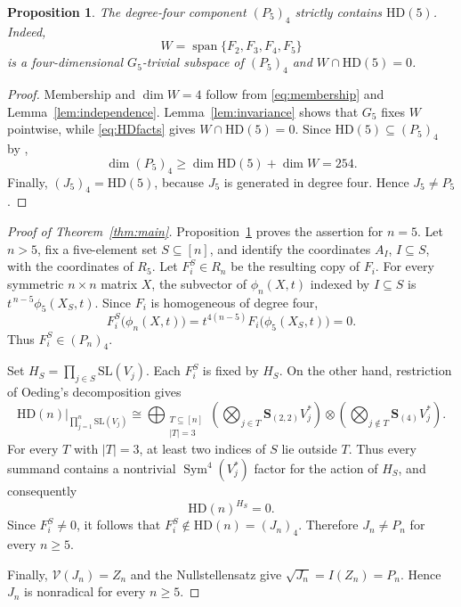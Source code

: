 \documentclass[11pt]{amsart}
\newtheorem{proposition}[theorem]{Proposition}
\theoremstyle{remark}
\newcommand{\HD}{\mathrm{HD}}
\newcommand{\Sym}{\operatorname{Sym}}
\newcommand{\bS}{\mathbf S}
\newcommand{\Span}{\operatorname{span}}
\begin{document}
\begin{proposition}\label{prop:n5}
The degree-four component \((P_5)_4\) strictly contains \(\HD(5)\).
Indeed,
\[
  W=\Span\{F_2,F_3,F_4,F_5\}
\]
is a four-dimensional \(G_5\)-trivial subspace of \((P_5)_4\) and
\(W\cap\HD(5)=0\).
\end{proposition}

\begin{proof}
Membership and \(\dim W=4\) follow from
\eqref{eq:membership} and Lemma~\ref{lem:independence}.
Lemma~\ref{lem:invariance} shows that \(G_5\) fixes \(W\) pointwise,
while \eqref{eq:HDfacts} gives \(W\cap\HD(5)=0\). Since
\(\HD(5)\subseteq(P_5)_4\) by \cite[Proposition~5.5]{Oeding},
\[
  \dim(P_5)_4\geq\dim\HD(5)+\dim W=254.
\]
Finally, \((J_5)_4=\HD(5)\), because \(J_5\) is generated in degree
four. Hence \(J_5\neq P_5\).
\end{proof}

\begin{proof}[Proof of Theorem~\ref{thm:main}]
Proposition~\ref{prop:n5} proves the assertion for \(n=5\).
Let \(n>5\), fix a five-element set \(S\subseteq[n]\), and identify the
coordinates \(A_I\), \(I\subseteq S\), with the coordinates of
\(R_5\). Let \(F_i^S\in R_n\) be the resulting copy of \(F_i\).
For every symmetric \(n\times n\) matrix \(X\), the subvector of
\(\phi_n(X,t)\) indexed by \(I\subseteq S\) is
\(t^{\,n-5}\phi_5(X_S,t)\). Since \(F_i\) is homogeneous of degree four,
\[
  F_i^S\bigl(\phi_n(X,t)\bigr)
  =t^{4(n-5)}F_i\bigl(\phi_5(X_S,t)\bigr)=0.
\]
Thus \(F_i^S\in(P_n)_4\).

Set \(H_S=\prod_{j\in S}\mathrm{SL}(V_j)\). Each \(F_i^S\) is fixed by
\(H_S\). On the other hand, restriction of Oeding's decomposition gives
\[
 \HD(n)\big|_{\prod_{j=1}^n\mathrm{SL}(V_j)}
 \cong
 \bigoplus_{\substack{T\subseteq[n]\\ |T|=3}}
 \left(
   \bigotimes_{j\in T}\bS_{(2,2)}V_j^*
 \right)
 \otimes
 \left(
   \bigotimes_{j\notin T}\bS_{(4)}V_j^*
 \right).
\]
For every \(T\) with \(|T|=3\), at least two indices of \(S\) lie
outside \(T\). Thus every summand contains a nontrivial
\(\Sym^4(V_j^*)\) factor for the action of \(H_S\), and consequently
\[
  \HD(n)^{H_S}=0.
\]
Since \(F_i^S\neq0\), it follows that \(F_i^S\notin\HD(n)=(J_n)_4\).
Therefore \(J_n\neq P_n\) for every \(n\geq5\).

Finally, \(\mathcal V(J_n)=Z_n\) \cite[Theorem~1.3]{Oeding} and the
Nullstellensatz give \(\sqrt{J_n}=I(Z_n)=P_n\). Hence \(J_n\) is
nonradical for every \(n\geq5\).
\end{proof}
\end{document}
